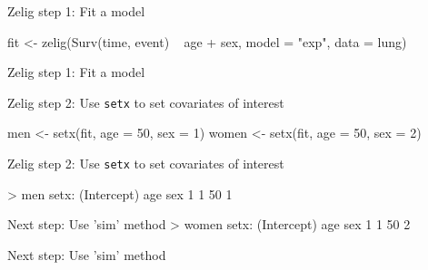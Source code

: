 \documentclass{beamer}
\begin{document}
\begin{frame}[fragile]{Zelig step 1: Fit a model}
\begin{scriptsize}
\begin{semiverbatim}
fit <- zelig(Surv(time, event) ~ age + sex,
             model = "exp",
             data = lung)
\end{semiverbatim}
\end{scriptsize}
\end{frame}

\begin{frame}[fragile]{Zelig step 1: Fit a model}
\begin{scriptsize}
\end{scriptsize}
\end{frame}

\begin{frame}[fragile]{Zelig step 2: Use \texttt{setx} to set covariates of interest}
\begin{scriptsize}
\begin{semiverbatim}
men <- setx(fit, age = 50, sex = 1)
women <- setx(fit, age = 50, sex = 2)
\end{semiverbatim}
\end{scriptsize}
\end{frame}

\begin{frame}[fragile]{Zelig step 2: Use \texttt{setx} to set covariates of interest}
\begin{scriptsize}
\begin{semiverbatim}
> men
setx:
  (Intercept) age sex
1           1  50   1

Next step: Use 'sim' method
> women
setx:
  (Intercept) age sex
1           1  50   2

Next step: Use 'sim' method
\end{semiverbatim}
\end{scriptsize}
\end{frame}
\end{document}
